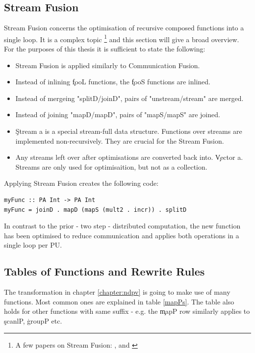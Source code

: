   \subsection{Stream Fusion}
    Stream Fusion concerns the optimisation of recursive composed functions
    into a single loop. It is a complex topic
    \footnote{A few papers on Stream Fusion:
    \cite{GenVectorFusion2013}, \cite{Fusion2007} and \cite{ArrayFusion2001Chakravarty}
    } and this section will give a broad overview.
    For the purposes of this thesis it is sufficient to state the following:
    \begin{itemize}
      \item Stream Fusion is applied similarly to Communication Fusion.
      \item Instead of inlining \c{fooL} functions, the \c{fooS} functions are inlined.
      \item Instead of mergeing "splitD/joinD", pairs of "unstream/stream" are merged.
      \item Instead of joining "mapD/mapD", pairs of "mapS/mapS" are joined.
      \item \c{Stream a} is a special stream-full data structure.
        Functions over streams are implemented non-recursively.
        They are crucial for the Stream Fusion.
      \item Any streams left over after optimisations are converted back into.
        \c{Vector a}. Streams are only used for optimisaition, but not as a collection.
    \end{itemize}
    Applying Stream Fusion creates the following code:
    \begin{lstlisting}
myFunc :: PA Int -> PA Int
myFunc = joinD . mapD (mapS (mult2 . incr)) . splitD
    \end{lstlisting}
    In contrast to the prior - two step - distributed computation,
    the new function has been optimised to reduce communication
    and applies both operations in a single loop per PU.
    
  \subsection{Tables of Functions and Rewrite Rules}
    The transformation in chapter \ref{chapter:ndpv} is going to
    make use of many functions. Most common ones are explained in table \ref{mapPs}.
    The table also holds for other functions with same suffix - e.g.
    the \c{mapP} row similarly applies to \c{scanlP}, \c{groupP} etc.
    
